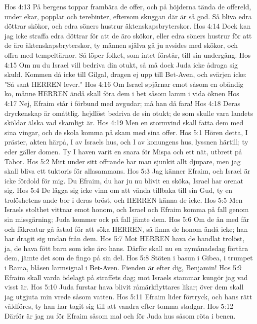 Hos 4:13  På bergens toppar frambära de offer, och på höjderna tända de offereld, under ekar, popplar och terebinter, eftersom skuggan där är så god. Så bliva edra döttrar skökor, och edra söners hustrur äktenskapsbryterskor.
Hos 4:14  Dock kan jag icke straffa edra döttrar för att de äro skökor, eller edra söners hustrur för att de äro äktenskapsbryterskor, ty männen själva gå ju avsides med skökor, och offra med tempeltärnor. Så löper folket, som intet förstår, till sin undergång.
Hos 4:15  Om nu du Israel vill bedriva din otukt, så må dock Juda icke ådraga sig skuld. Kommen då icke till Gilgal, dragen ej upp till Bet-Aven, och svärjen icke: "Så sant HERREN lever."
Hos 4:16  Om Israel spjärnar emot såsom en obändig ko, månne HERREN ändå skall föra dem i bet såsom lamm i vida öknen
Hos 4:17  Nej, Efraim står i förbund med avgudar; må han då fara!
Hos 4:18  Deras dryckenskap är omåttlig. hejdlöst bedriva de sin otukt; de som skulle vara landets sköldar älska vad skamligt är.
Hos 4:19  Men en stormvind skall fatta dem med sina vingar, och de skola komma på skam med sina offer.
Hos 5:1  Hören detta, I präster, akten härpå, I av Israels hus, och I av konungens hus, lyssnen härtill; ty eder gäller domen. Ty I haven varit en snara för Mispa och ett nät, utbrett på Tabor.
Hos 5:2  Mitt under sitt offrande har man sjunkit allt djupare, men jag skall bliva ett tuktoris för allasammans.
Hos 5:3  Jag känner Efraim, och Israel är icke fördold för mig. Du Efraim, du har ju nu blivit en sköka, Israel har orenat sig.
Hos 5:4  De lägga sig icke vinn om att vända tillbaka till sin Gud, ty en trolöshetens ande bor i deras bröst, och HERREN känna de icke.
Hos 5:5  Men Israels stolthet vittnar emot honom, och Israel och Efraim komma på fall genom sin missgärning; Juda kommer ock på fall jämte dem.
Hos 5:6  Om de än med får och fäkreatur gå åstad för att söka HERREN, så finna de honom ändå icke; han har dragit sig undan från dem.
Hos 5:7  Mot HERREN hava de handlat trolöst, ja, de hava fött barn som icke äro hans. Därför skall nu en nymånadsdag förtära dem, jämte det som de fingo på sin del.
Hos 5:8  Stöten i basun i Gibea, i trumpet i Rama, blåsen larmsignal i Bet-Aven. Fienden är efter dig, Benjamin!
Hos 5:9  Efraim skall varda ödelagt på straffets dag; mot Israels stammar kungör jag vad visst är.
Hos 5:10  Juda furstar hava blivit råmärkflyttares likar; över dem skall jag utgjuta min vrede såsom vatten.
Hos 5:11  Efraim lider förtryck, och hans rätt våldföres, ty han har tagit sig till att vandra efter tomma stadgar.
Hos 5:12  Därför är jag nu för Efraim såsom mal och för Juda hus såsom röta i benen.

